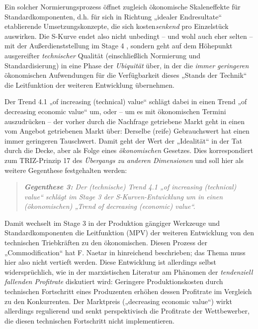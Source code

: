 \documentclass[11pt,a4paper]{article}
\begin{document}
Ein solcher Normierungsprozess öffnet zugleich ökonomische Skaleneffekte für
Standardkomponenten, d.h. für sich in Richtung „idealer Endresultate“
etablierende Umsetzungskonzepte, die sich kosten\emph{senkend} pro Einzelstück
auswirken.  Die S-Kurve endet also nicht unbedingt -- und wohl auch eher
selten -- mit der Außerdienststellung im Stage 4 \cite[S. 38]{TESE2018},
sondern geht auf dem Höhepunkt ausgereifter \emph{technischer} Qualität
(einschließlich Normierung und Standardisierung) in eine Phase der
\emph{Ubiquität} über, in der die \emph{immer geringeren} ökonomischen
Aufwendungen für die Verfügbarkeit dieses „Stands der Technik“ die
Leitfunktion der weiteren Entwicklung übernehmen.

Der Trend 4.1 „of increasing (technical) value“ schlägt dabei in einen Trend
„of decreasing economic value“ um, oder -- um es mit ökonomischen Termini
auszudrücken -- der vorher durch die Nachfrage getriebene Markt geht in einen
vom Angebot getriebenen Markt über: Derselbe (reife) Gebrauchswert hat einen
immer geringeren Tauschwert.  Damit geht der Wert der „Idealität“
\cite[Kap. 4.1.1]{KS2017} in der Tat durch die Decke, aber als Folge eines
\emph{ökonomischen} Gesetzes.  Dies korrespondiert zum TRIZ-Prinzip 17 des
\emph{Übergangs zu anderen Dimensionen} und soll hier als weitere Gegenthese
festgehalten werden:
\begin{quote}\it
  \textbf{Gegenthese 3:} Der (technische) Trend 4.1 „of increasing (technical)
  value“ schlägt im Stage 3 der S-Kurven-Entwicklung um in einen
  (ökonomischen) „Trend of decreasing (economic) value“.
\end{quote}
Damit wechselt im Stage 3 in der Produktion gängiger Werkzeuge und
Standardkomponenten die Leitfunktion (MPV) der weiteren Entwicklung von den
technischen Triebkräften zu den ökonomischen. Diesen Prozess der
„Commodification“ hat F. Naetar in \cite{Naetar2005} hinreichend beschrieben;
das Thema muss hier also nicht vertieft werden. Diese Entwicklung ist
allerdings selbst widersprüchlich, wie in der marxistischen Literatur am
Phänomen der \emph{tendenziell fallenden Profitrate} diskutiert wird:
Geringere Produktionskosten durch technischen Fortschritt eines Produzenten
erhöhen dessen Profitrate im Vergleich zu den Konkurrenten. Der Marktpreis
(„decreasing economic value“) wirkt allerdings regulierend und senkt
perspektivisch die Profitrate der Wettbewerber, die diesen technischen
Fortschritt nicht implementieren.
\end{document}
